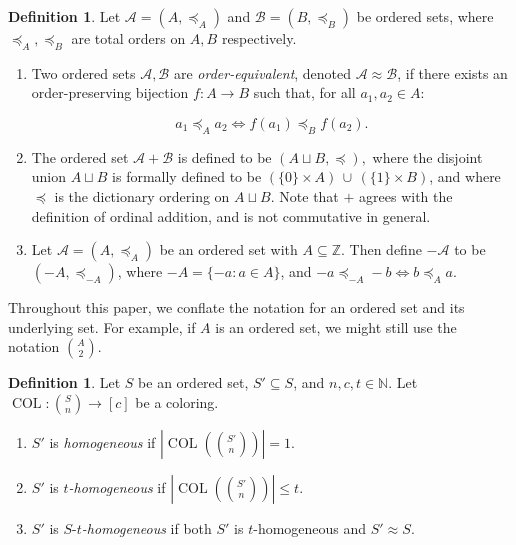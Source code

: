 \documentclass[10pt,a4paper]{article}
\newcommand{\oequiv}{\approx}
\newcommand{\setconcat}{+}
\newcommand{\COL}{\operatorname{COL}}
\newcommand{\N}{\mathbb{N}}
\newcommand{\Z}{\mathbb{Z}}
\newcommand{\numpoints}{n}
\newcommand{\numcolors}{c}
\theoremstyle{plain}
\theoremstyle{definition}
\newtheorem{definition}[theorem]{Definition}
\begin{document}
\begin{definition} 
Let $\mathcal{A} = (A,\preceq_A)$ and $\mathcal{B} = (B,\preceq_B)$ be ordered sets, where
$\preceq_A, \preceq_B$ are total orders on $A, B$ respectively.

\begin{enumerate}

\item Two ordered sets
$\mathcal{A},\mathcal{B}$ are \textit{order-equivalent}, denoted $\mathcal{A}\oequiv \mathcal{B}$, 
if there exists an order-preserving bijection $f\colon A \to B$ such that, for all $a_1, a_2 \in A$: 

$$a_1 \preceq_A a_2 \iff f(a_1) \preceq_B f(a_2).$$

\item 
The ordered set $\mathcal{A} \setconcat \mathcal{B}$ is defined to be
$(A\sqcup B, \preceq),$ where the disjoint union $A\sqcup B$ is formally defined to be
$(\{0\} \times A) \, \cup\, (\{1\} \times B)$, and where $\preceq$ is the dictionary ordering on $A\sqcup B.$
Note that $\setconcat$ agrees with the definition of ordinal addition, and is not commutative in general.

\item 
Let $\mathcal{A}=(A,\preceq_A)$ be an ordered set with $A \subseteq \Z$. Then define $-\mathcal{A}$ to be $(-A,\preceq_{-A})$, where 
$-A = \{ -a \colon a \in A\}$, and
$-a \preceq_{-A} -b \iff b \preceq_{A} a$.
\end{enumerate} 

\end{definition} 

Throughout this paper, we conflate the notation for an ordered set and its underlying set. 
For example, if $A$ is an ordered set, we might still use the notation $\binom{A}{2}$.

\begin{definition}\label{def:homogeneous}
Let $S$ be an ordered set, $S'\subseteq S$, and $\numpoints,\numcolors,t \in \N.$ Let $\COL \colon \binom{S}{\numpoints} \to [\numcolors]$ be a coloring.
\begin{enumerate}
    \item 
$S'$ is \textit{homogeneous} if  $\left|\COL\left(\binom{S'}{\numpoints}\right)\right|= 1$. 
\item 
 $S'$ is \textit{$t$-homogeneous} if $\left|\COL\left(\binom{S'}{\numpoints}\right)\right|\leq t$. 
 \item 
$S'$ is $S$-\textit{$t$-homogeneous} if both $S'$ is $t$-homogeneous and $S'\oequiv S$.
\end{enumerate}
\end{definition}
\end{document}
